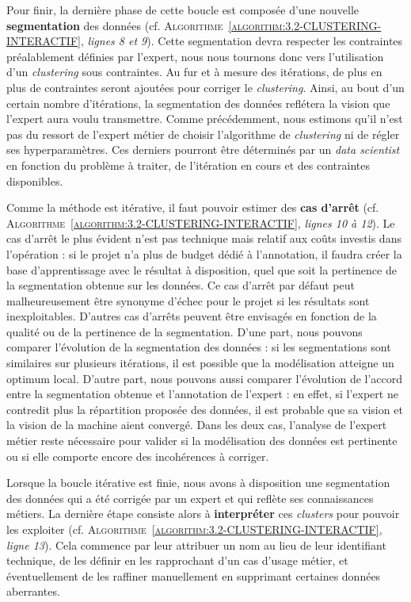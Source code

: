 		Pour finir, la dernière phase de cette boucle est composée d'une nouvelle \textbf{segmentation} des données (cf. \textsc{Algorithme~\ref{algorithm:3.2-CLUSTERING-INTERACTIF}}, \textit{lignes 8 et 9}).
		Cette segmentation devra respecter les contraintes préalablement définies par l'expert, nous nous tournons donc vers l'utilisation d'un \textit{clustering} sous contraintes.
		Au fur et à mesure des itérations, de plus en plus de contraintes seront ajoutées pour corriger le \textit{clustering}.
		Ainsi, au bout d'un certain nombre d'itérations, la segmentation des données reflétera la vision que l'expert aura voulu transmettre.
		Comme précédemment, nous estimons qu'il n'est pas du ressort de l'expert métier de choisir l'algorithme de \textit{clustering} ni de régler ses hyperparamètres.
		Ces derniers pourront être déterminés par un \textit{data scientist} en fonction du problème à traiter, de l'itération en cours et des contraintes disponibles.
		
		Comme la méthode est itérative, il faut pouvoir estimer des \textbf{cas d'arrêt} (cf. \textsc{Algorithme~\ref{algorithm:3.2-CLUSTERING-INTERACTIF}}, \textit{lignes 10 à 12}).
		Le cas d'arrêt le plus évident n'est pas technique mais relatif aux coûts investis dans l'opération : si le projet n'a plus de budget dédié à l'annotation, il faudra créer la base d'apprentissage avec le résultat à disposition, quel que soit la pertinence de la segmentation obtenue sur les données.
		Ce cas d'arrêt par défaut peut malheureusement être synonyme d'échec pour le projet si les résultats sont inexploitables.
		D'autres cas d'arrêts peuvent être envisagés en fonction de la qualité ou de la pertinence de la segmentation.
		D'une part, nous pouvons comparer l'évolution de la segmentation des données : si les segmentations sont similaires sur plusieurs itérations, il est possible que la modélisation atteigne un optimum local.
		D'autre part, nous pouvons aussi comparer l'évolution de l'accord entre la segmentation obtenue et l'annotation de l'expert : en effet, si l'expert ne contredit plus la répartition proposée des données, il est probable que sa vision et la vision de la machine aient convergé.
		Dans les deux cas, l'analyse de l'expert métier reste nécessaire pour valider si la modélisation des données est pertinente ou si elle comporte encore des incohérences à corriger.

		Lorsque la boucle itérative est finie, nous avons à disposition une segmentation des données qui a été corrigée par un expert et qui reflète ses connaissances métiers.
		La dernière étape consiste alors à \textbf{interpréter} ces \textit{clusters} pour pouvoir les exploiter (cf. \textsc{Algorithme~\ref{algorithm:3.2-CLUSTERING-INTERACTIF}}, \textit{ligne 13}).
		Cela commence par leur attribuer un nom au lieu de leur identifiant technique, de les définir en les rapprochant d'un cas d'usage métier, et éventuellement de les raffiner manuellement en supprimant certaines données aberrantes.
		
